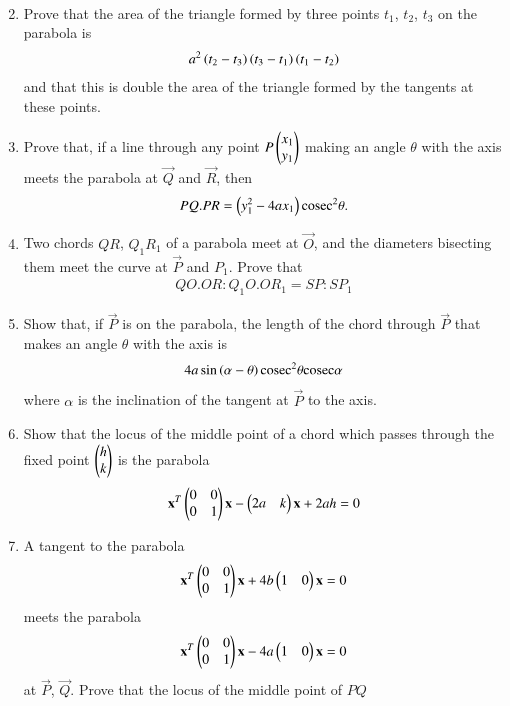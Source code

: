 \begin{enumerate}[label=\arabic*.,ref=\thesubsection.\theenumi]
\begin{align}
\end{align}
\item Prove that the area of the triangle formed by three points $t_1$, $t_2$, $t_3$ on the parabola is
\begin{align}
a^2\left(t_2-t_3\right)\left(t_3-t_1\right)\left(t_1-t_2\right)
\end{align}
and that this is double the area of the triangle formed by the tangents at these points.
\item Prove that, if a line through any point $P \begin{pmatrix}x_1\\y_1\end{pmatrix}$ making an angle $\theta$ with the axis meets the parabola
at $\vec{Q}$ and $\vec{R}$, then
\begin{align}
PQ.PR = \left(y_1^2-4ax_1\right)\text{cosec}^2\theta.
\end{align}
\item Two chords $QR$, $Q_1R_1$ of a parabola meet at $\vec{O}$, and the diameters bisecting them meet the curve at $\vec{P}$ and $P_1$.  Prove that
\begin{align}
QO.OR:Q_1O.OR_1=SP:SP_1
\end{align}
\item Show that, if $\vec{P}$ is on the parabola, the length of the chord through $\vec{P}$ that makes an angle $\theta$ with the axis is
\begin{align}
4a\sin\left(\alpha-\theta\right)\text{cosec}^2\theta\text{cosec}\alpha
\end{align}
where $\alpha$ is the inclination of the tangent at $\vec{P}$ to the axis.
\item Show that the locus of the middle point of a chord which passes through the fixed point $\begin{pmatrix}h\\k\end{pmatrix}$ is the parabola
\begin{align}
\mathbf{x}^T\begin{pmatrix}0 & 0\\0 & 1\end{pmatrix}\mathbf{x}-\begin{pmatrix}2a & k \end{pmatrix}\mathbf{x}+2ah= 0 
\end{align}
\item A tangent to the parabola 
\begin{align}
\mathbf{x}^T\begin{pmatrix}0 & 0\\0 & 1\end{pmatrix}\mathbf{x}+4b\begin{pmatrix}1 & 0 \end{pmatrix}\mathbf{x}= 0 
\end{align}
meets the parabola 
\begin{align}
\mathbf{x}^T\begin{pmatrix}0 & 0\\0 & 1\end{pmatrix}\mathbf{x}-4a\begin{pmatrix}1 & 0 \end{pmatrix}\mathbf{x}= 0 
\end{align}
at $\vec{P}$, $\vec{Q}$.  Prove that the locus of the middle point of $PQ$

\end{enumerate}
